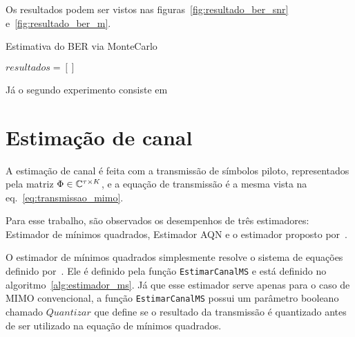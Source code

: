 \documentclass{article}
\begin{document}
Os resultados podem ser vistos nas figuras~\ref{fig:resultado_ber_snr} e~\ref{fig:resultado_ber_m}. 

\begin{algorithm}
    \label{alg:ber_snr}
    \caption{Estimativa do BER via MonteCarlo}
    $resultados = []$
\end{algorithm}

Já o segundo experimento consiste em 

\section{Estimação de canal}
\label{sec:estimacao_canal}

A estimação de canal é feita com a transmissão de símbolos piloto, representados pela matriz $\Phi\in\mathbb{C}^{\tau\times K}$, e a equação de transmissão é a mesma vista na eq.~\eqref{eq:transmissao_mimo}. 

Para esse trabalho, são observados os desempenhos de três estimadores: Estimador de mínimos quadrados, Estimador AQN e o estimador proposto por~\cite{li.etal_2017a}. 

O estimador de mínimos quadrados simplesmente resolve o sistema de equações definido por~\cite[eq. 4]{li.etal_2017a}. Ele é definido pela função \texttt{EstimarCanalMS} e está definido no algoritmo~\ref{alg:estimador_ms}. Já que esse estimador serve apenas para o caso de MIMO convencional, a função \texttt{EstimarCanalMS} possui um parâmetro booleano chamado $Quantizar$ que define se o resultado da transmissão é quantizado antes de ser utilizado na equação de mínimos quadrados. 
\end{document}
